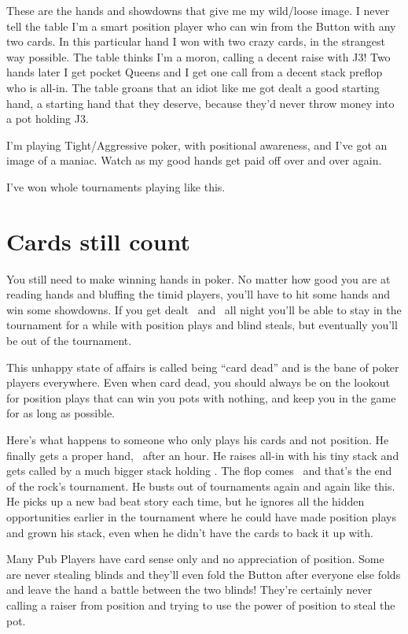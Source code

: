 These are the hands and showdowns that give me my wild/loose image.
I never tell the table I'm a smart position player who can
win from the Button with any two cards. In this particular hand I
won with two crazy cards, in the strangest way possible. The table
thinks I'm a moron, calling a decent raise with J3! Two hands later I get
pocket Queens and I get one call from a decent stack preflop who is all-in.
The table groans that an idiot like me got dealt a good
starting hand, a starting hand that they deserve, because they'd never
throw money into a pot holding J3.

I'm playing Tight/Aggressive poker, with positional awareness,
and I've got an image of a maniac. Watch as my good hands get paid
off over and over again.

I've won whole tournaments playing like this.

\section{Cards still count}

You still need to make winning hands in poker. No matter how good you
are at reading hands and bluffing the timid players, you'll have to
hit some hands and win some showdowns. If you get dealt
\tenh\twoc\ and \Qh\fivec\ all night you'll be able to stay in
the tournament for a while with position plays and blind steals,
but eventually you'll be out of the tournament.

This unhappy state of affairs is called being ``card dead'' and is
the bane of poker players everywhere. Even when card dead, you should always
be on the lookout for position plays that can win you pots with nothing,
and keep you in the game for as long as possible.

Here's what happens to someone who only plays his cards and not position.
He finally gets a proper hand, \tenh\tenc\ after an hour. He raises all-in
with his tiny stack and gets called by a much bigger stack
holding \Kd\Qd. The flop comes \Kh\sixc\trec\ and that's the
end of the rock's tournament. He busts out of tournaments again and
again like this. He picks up a new bad beat story each time, but he
ignores all the hidden opportunities earlier in the tournament
where he could have made position plays and grown his stack,
even when he didn't have the cards to back it up with.

Many Pub Players have card sense only and no appreciation of position.
Some are never stealing blinds and they'll even fold the
Button after everyone else folds and leave the hand a battle between the
two blinds! They're certainly never calling a raiser from position and
trying to use the power of position to steal the pot.

